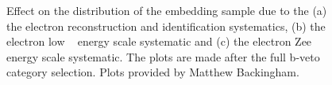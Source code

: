 \begin{figure}[!h]
     \begin{center}
    \end{center}
    \caption{Effect on the \mmc distribution of the embedding sample due to the (a) the electron reconstruction and identification systematics, (b) the electron low \pt~ energy scale systematic and (c) the electron Zee energy scale systematic. The plots are made after the full b-veto category selection. Plots 
	provided by Matthew Backingham.}
\end{figure}

